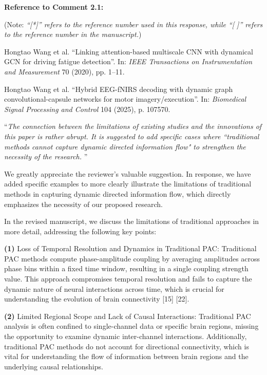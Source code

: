 \documentclass[12pt,technote,onecolumn]{IEEEtran}
\begin{document}
\vspace{1mm}

\noindent \textbf{Reference to Comment 2.1:} 

\noindent(Note: \textit{``[*]'' refers to the reference number used in this response, while ``[ ]'' refers to the reference number in the manuscript.})

\noindent[29]\:Hongtao Wang et al. ``Linking attention-based multiscale CNN with dynamical GCN for driving fatigue detection”. In: \textit{IEEE Transactions on Instrumentation and Measurement} 70 (2020), pp. 1–11.

\noindent[30]\:Hongtao Wang et al. ``Hybrid EEG-fNIRS decoding with dynamic graph convolutional-capsule networks for motor imagery/execution”. In: \textit{Biomedical Signal Processing and Control} 104 (2025), p. 107570.

\vspace{4mm} 

 ``{\it The connection between the limitations of existing studies and the innovations of this paper is rather abrupt. It is suggested to add specific cases where ``traditional methods cannot capture dynamic directed information flow" to strengthen the necessity of the research.
}''
\vspace{1mm}


We greatly appreciate the reviewer’s valuable suggestion. In response, we have added specific examples to more clearly illustrate the limitations of traditional methods in capturing dynamic directed information flow, which directly emphasizes the necessity of our proposed research.

In the revised manuscript, we discuss the limitations of traditional approaches in more detail, addressing the following key points:

\textbf{(1)} Loss of Temporal Resolution and Dynamics in Traditional PAC: Traditional PAC methods compute phase-amplitude coupling by averaging amplitudes across phase bins within a fixed time window, resulting in a single coupling strength value. This approach compromises temporal resolution and fails to capture the dynamic nature of neural interactions across time, which is crucial for understanding the evolution of brain connectivity [15] [22].

\textbf{(2)} Limited Regional Scope and Lack of Causal Interactions: Traditional PAC analysis is often confined to single-channel data or specific brain regions, missing the opportunity to examine dynamic inter-channel interactions. Additionally, traditional PAC methods do not account for directional connectivity, which is vital for understanding the flow of information between brain regions and the underlying causal relationships. 
\end{document}
